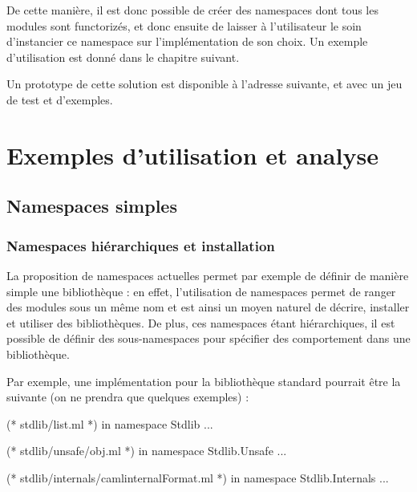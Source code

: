 \documentclass[11pt,a4paper]{report}
\begin{document}
De cette manière, il est donc possible de créer des namespaces dont tous les
modules sont functorizés, et donc ensuite de laisser à l'utilisateur le soin
d'instancier ce namespace sur l'implémentation de son choix. Un exemple
d'utilisation est donné dans le chapitre suivant.

\medskip

Un prototype de cette solution est disponible à l'adresse suivante, et avec un
jeu de test et d'exemples.

\chapter{Exemples d'utilisation et analyse}

\section{Namespaces simples}

\subsection{Namespaces hiérarchiques et installation}

La proposition de namespaces actuelles permet par exemple de définir de manière
simple une bibliothèque : en effet, l'utilisation de namespaces permet de ranger
des modules sous un même nom et est ainsi un moyen naturel de décrire, installer
et utiliser des bibliothèques. De plus, ces namespaces étant hiérarchiques, il
est possible de définir des sous-namespaces pour spécifier des comportement dans
une bibliothèque.

Par exemple, une implémentation pour la bibliothèque standard pourrait être la
suivante (on ne prendra que quelques exemples) :
\begin{OCaml}
(* stdlib/list.ml *)
in namespace Stdlib
...
\end{OCaml}

\begin{OCaml}
(* stdlib/unsafe/obj.ml *)
in namespace Stdlib.Unsafe
...
\end{OCaml}

\begin{OCaml}
(* stdlib/internals/camlinternalFormat.ml *)
in namespace Stdlib.Internals
...
\end{OCaml}
\end{document}
